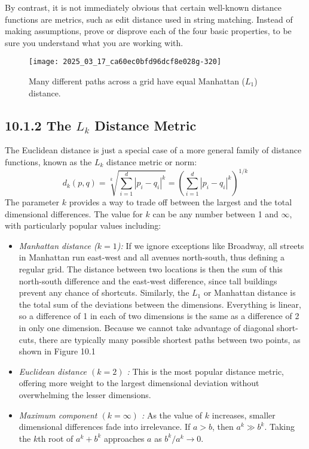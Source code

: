 \documentclass[10pt]{article}
\begin{document}
By contrast, it is not immediately obvious that certain well-known distance functions are metrics, such as edit distance used in string matching. Instead of making assumptions, prove or disprove each of the four basic properties, to be sure you understand what you are working with.

\begin{figure}[ht]
    \centering
    \texttt{[image: 2025\_03\_17\_ca60ec0bfd96dcf8e028g-320]}
    \caption{Many different paths across a grid have equal Manhattan ($L_1$) distance.}
\end{figure}

\subsection*{10.1.2 The $L_k$ Distance Metric}
The Euclidean distance is just a special case of a more general family of distance functions, known as the $L_k$ distance metric or norm:
\[
d_{k}(p, q)=\sqrt[k]{\sum_{i=1}^{d}\left|p_{i}-q_{i}\right|^{k}}=\left(\sum_{i=1}^{d}\left|p_{i}-q_{i}\right|^{k}\right)^{1 / k}
\]
The parameter $k$ provides a way to trade off between the largest and the total dimensional differences. The value for $k$ can be any number between 1 and $\infty$, with particularly popular values including:
\begin{itemize}
    \item \textit{Manhattan distance ($k=1$):} If we ignore exceptions like Broadway, all streets in Manhattan run east-west and all avenues north-south, thus defining a regular grid. The distance between two locations is then the sum of this north-south difference and the east-west difference, since tall buildings prevent any chance of shortcuts. Similarly, the $L_1$ or Manhattan distance is the total sum of the deviations between the dimensions. Everything is linear, so a difference of 1 in each of two dimensions is the same as a difference of 2 in only one dimension. Because we cannot take advantage of diagonal short-cuts, there are typically many possible shortest paths between two points, as shown in Figure 10.1
    \item \textit{Euclidean distance $(k=2)$ :} This is the most popular distance metric, offering more weight to the largest dimensional deviation without overwhelming the lesser dimensions.
    \item \textit{Maximum component $(k=\infty)$ :} As the value of $k$ increases, smaller dimensional differences fade into irrelevance. If $a>b$, then $a^{k} \gg b^{k}$. Taking the $k$th root of $a^{k}+b^{k}$ approaches $a$ as $b^{k} / a^{k} \rightarrow 0$.
\end{itemize}
\end{document}
